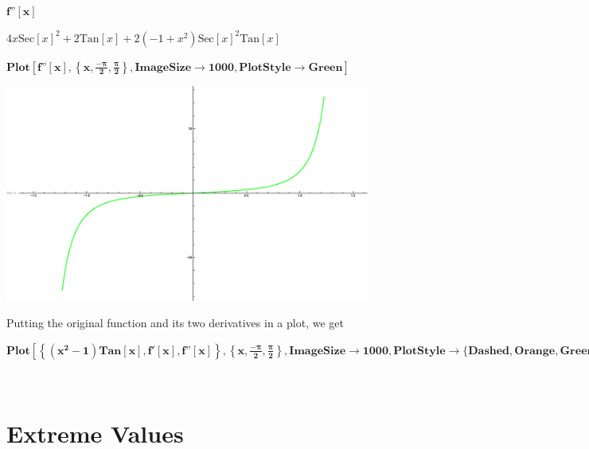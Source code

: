 \documentclass{article}
\begin{document}
\begin{doublespace}
\noindent\(\pmb{f\text{''}[x]}\)
\end{doublespace}

\begin{doublespace}
\noindent\(4 x \text{Sec}[x]^2+2 \text{Tan}[x]+2 \left(-1+x^2\right) \text{Sec}[x]^2 \text{Tan}[x]\)
\end{doublespace}

\begin{doublespace}
\noindent\(\pmb{\text{Plot}\left[f\text{''}[x],\left\{x,\frac{-\pi }{2},\frac{\pi }{2}\right\}, \text{ImageSize}\to 1000,\text{PlotStyle}\to \text{Green}\right]}\)
\end{doublespace}

\includegraphics[width=0.9\textwidth]{curve_tracing_09_gr3.eps}

Putting the original function and its two derivatives in a plot, we get

\begin{doublespace}
\noindent\(\pmb{\text{Plot}\left[\left\{\left(x^2-1\right)\text{Tan}[x],f'[x],f\text{''}[x]\right\},\left\{x,\frac{-\pi }{2},\frac{\pi }{2}\right\},
\text{ImageSize}\to 1000,\text{PlotStyle}\to  \{\text{Dashed}, \text{Orange}, \text{Green}\},\text{PlotLegends}\to \text{{``}Expressions{''}}\right]}\)
\end{doublespace}

\begin{doublespace}
\noindent\(\begin{array}{cc}
  &  \\
\end{array}\)
\end{doublespace}

\section*{Extreme Values}
\end{document}
